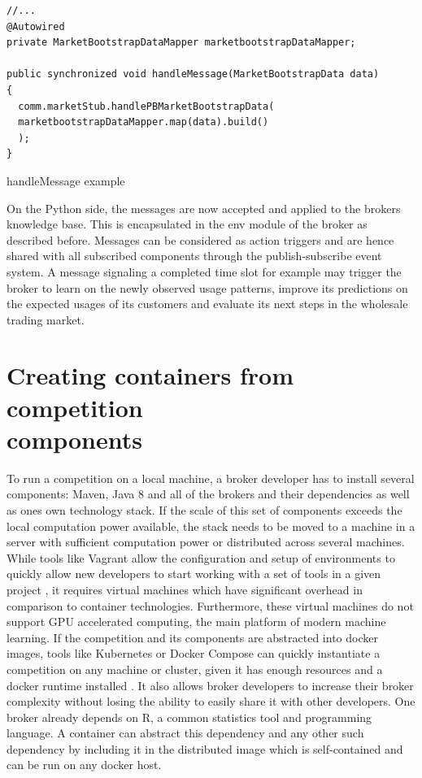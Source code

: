 \begin{listing}
    \begin{verbatim}
//...
@Autowired
private MarketBootstrapDataMapper marketbootstrapDataMapper;

public synchronized void handleMessage(MarketBootstrapData data)
{
  comm.marketStub.handlePBMarketBootstrapData(
  marketbootstrapDataMapper.map(data).build()
  );
}
    \end{verbatim}
    \caption{handleMessage example}
    \label{lst:handlemessageexample}
\end{listing}

On the Python side, the messages are now accepted and applied to the brokers knowledge base. This is encapsulated in the
env module of the broker as described before. Messages can be considered as action triggers and are hence
shared with all subscribed components through the publish-subscribe event system. A message signaling a completed
time slot for example may trigger the broker to learn on the newly observed usage patterns, improve its predictions on
the expected usages of its customers and evaluate its next steps in the wholesale trading market.

\section{Creating containers from competition\\ components}
\label{sec:creating_containers_from_competition_components}

To run a competition on a local machine, a broker developer has to install several components: Maven, Java 8 and all of the brokers and
their dependencies as well as ones own technology stack. If the scale of this set of components exceeds the local
computation power available, the stack needs to be moved to a machine in a server with sufficient computation power or
distributed across several machines.
While tools like Vagrant allow
the configuration and setup of environments to quickly allow new developers to start working with a set of tools in a
given project \citep{vagrant} , it requires virtual machines which have significant overhead in comparison to container
technologies. Furthermore, these virtual machines do not support \ac{GPU} accelerated computing, the main platform of
modern machine learning. If the competition and its components are abstracted into docker images, tools like Kubernetes
or Docker Compose can quickly instantiate a competition on any machine or cluster, given it has enough resources and a
docker runtime installed \citep{docker}. It also allows broker developers to increase their broker complexity without
losing the ability to easily share it with other developers. One broker already depends on R, a common statistics tool
and programming language. A container can abstract this dependency and any other such dependency by including it in
the distributed image which is self-contained and can be run on any docker host.

